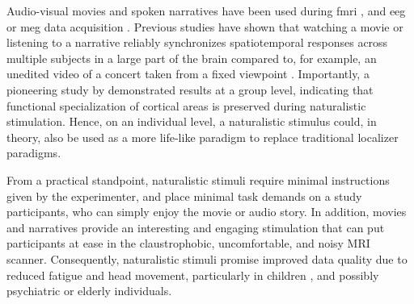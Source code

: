 Audio-visual movies and spoken narratives have been used during \ac{fmri}
\citep[s.][for reviews]{hamilton2018revolution, hasson2008neurocinematics,
jaaskelainen2021movies, saarimaki2021naturalistic}, and \ac{eeg} or \ac{meg}
data acquisition \citep[s.][for reviews]{alday2019meg, kandylaki2019story}.
Previous studies have shown that watching a movie \citep{hasson2004intersubject,
hasson2010reliability} or listening to a narrative \citep{lerner2011topographic,
wilson2008beyond} reliably synchronizes spatiotemporal responses across multiple
subjects in a large part of the brain compared to, for example, an unedited
video of a concert taken from a fixed viewpoint
\citep{hasson2008neurocinematics}.
Importantly, a pioneering study by \citet{bartels2004mapping} demonstrated
results at a group level, indicating that functional specialization of cortical
areas is preserved during naturalistic stimulation.
Hence, on an individual level, a naturalistic stimulus could, in theory, also be
used as a more life-like paradigm to replace traditional localizer paradigms.


From a practical standpoint, naturalistic stimuli require minimal instructions
given by the experimenter, and place minimal task demands on a study
participants, who can simply enjoy the movie or audio story.
%
In addition, movies and narratives provide an interesting and engaging
stimulation that can put participants at ease in the claustrophobic,
uncomfortable, and noisy MRI scanner.
%
Consequently, naturalistic stimuli promise improved data quality due to reduced
fatigue and head movement, particularly in children
\citep{vanderwal2015inscapes}, and possibly psychiatric
\citep{eickhoff2020towards} or elderly individuals.


